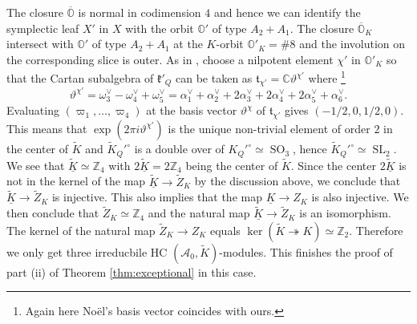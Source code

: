 \documentclass[12pt]{amsart}
\newcommand{\C}{\mathbb{C}}
\newcommand{\A}{\mathcal{A}}
\newcommand{\Orb}{\mathbb{O}}
\newcommand{\Z}{\mathbb{Z}}
\newcommand{\kf}{\mathfrak{k}}
\newcommand{\tf}{\mathfrak{t}}
\newcommand{\SL}{\operatorname{SL}}
\newcommand{\SO}{\operatorname{SO}}
\newcommand{\GL}{\operatorname{GL}}
\theoremstyle{definition}
\numberwithin{equation}{section}
\begin{document}
The closure $\overline{\Orb}$ is normal in codimension $4$ and hence we can identify the symplectic leaf $X'$ in $X$ with the orbit $\Orb'$ of type $A_2 + A_1$. The closure $\overline{\Orb}_K$ intersect with $\Orb'$ of type $A_2 + A_1$ at the $K$-orbit $\Orb'_K  = \# 8$ and the involution on the corresponding slice is outer. As in \cite[Table 4]{Noel2}, choose a nilpotent element $\chi'$ in $\Orb'_K$ so that the Cartan subalgebra of $\kf'_Q$ can be taken as $\tf_{\chi'} = \C \vartheta^{\chi'}$ where \footnote{Again here No{\"e}l's basis vector coincides with ours.}
\[ \vartheta^{\chi'} = \omega^\vee_3 - \omega^\vee_4 + \omega^\vee_5 = \alpha^\vee_1 + \alpha^\vee_2 + 2\alpha^\vee_3 + 2\alpha^\vee_4 + 2\alpha^\vee_5+ \alpha^\vee_6.\]
Evaluating $(\varpi_1, \ldots, \varpi_4)$ at the basis vector $\vartheta^{\chi}$ of $\tf_{\chi'}$ gives $(-1/2, 0, 1/2, 0)$. This means that $\exp(2\pi i \vartheta^{\chi'})$ is the unique non-trivial element of order $2$ in the center of $\tilde{K}$ %
and $\tilde{K}_Q'^\circ$ is a double over of $K_Q'^\circ \simeq \SO_3$, hence $\tilde{K}_Q'^\circ \simeq \SL_2$. We see that $\underline{\tilde{K}} \simeq \Z_4$ with $2 \underline{\tilde{K}} = 2 \Z_4$ being the center of $\tilde{K}$. Since the center $2 \underline{\tilde{K}}$ is not in the kernel of the map $\underline{\tilde{K}} \to \tilde{Z}_K$ by the discussion above, we conclude that $\underline{\tilde{K}} \to \tilde{Z}_K$ is injective. This also implies that the map $\underline{K} \to Z_K$ is also injective. %
We then conclude that $\tilde{Z}_K \simeq \Z_4$ and the natural map $\underline{\tilde{K}} \to \tilde{Z}_K$ is an isomorphism. The kernel of the natural map $\tilde{Z}_K \to Z_K$ equals $\ker(\tilde{K} \twoheadrightarrow K) \simeq \Z_2$. Therefore we only get three irreducbile HC $(\A_0, \tilde{K})$-modules. This finishes the proof of part (ii) of Theorem \ref{thm:exceptional} in this case.
\end{document}

